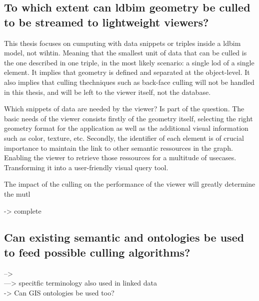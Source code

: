 \subsection[Can \acs{ldbim} be culled?]{To which extent can \acs{ldbim} geometry be culled \\
	to be streamed to lightweight viewers?}

This thesis focuses on cumputing with data snippets or triples inside a \ac{ldbim} model, not wihtin. Meaning that the smallest unit of data that can be culled is the one described in one triple, in the most likely scenario: a single \ac{lod} of a single element. It implies that geometry is defined and separated at the object-level. It also implies that culling thechniques such as back-face culling will not be handled in this thesis, and will be left to the viewer itself, not the database.

Which snippets of data are needed by the viewer? Is part of the question. The basic needs of the viewer consists firstly of the geometry itself, selecting the right geometry format for the application as well as the additional visual information such as color, texture, etc. Secondly, the identifier of each element is of crucial importance to maintain the link to other semantic ressources in the graph. Enabling the viewer to retrieve those ressources for a multitude of usecases. Transforming it into a user-friendly visual query tool.

The impact of the culling on the performance of the viewer will greatly determine the mutl

-> complete

\subsection[Can existing semantic be used?]{Can existing semantic and ontologies be used\\
	to feed possible culling algorithms?}
-->\cite{Johansson2009}\\
---> specitfic terminology also used in linked data\\
-> Can GIS ontologies be used too?



